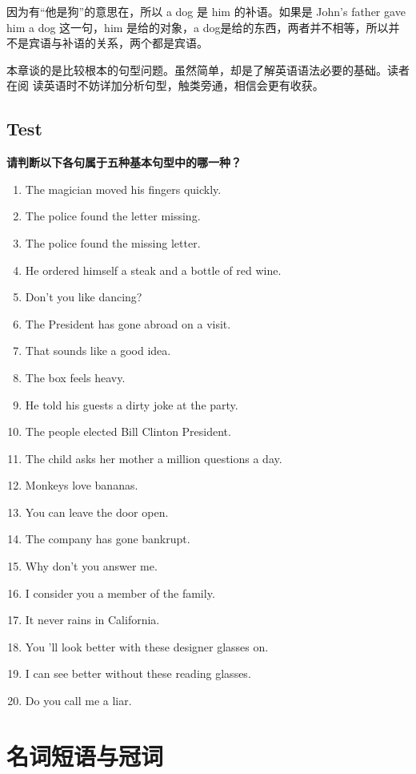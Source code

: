 \documentclass{yufa}
\begin{document}
因为有“他是狗”的意思在，所以 a dog 是 him 的补语。如果是 John's father
gave him a dog 这一句，him 是给的对象，a dog是给的东西，两者并不相等，所以并
不是宾语与补语的关系，两个都是宾语。

本章谈的是比较根本的句型问题。虽然简单，却是了解英语语法必要的基础。读者在阅
读英语时不妨详加分析句型，触类旁通，相信会更有收获。

\section{Test}

\textbf{请判断以下各句属于五种基本句型中的哪一种？}

\begin{enumerate}
\item The magician moved his fingers quickly.
\item The police found the letter missing.
\item The police found the missing letter.
\item He ordered himself a steak and a bottle of red wine.
\item Don't you like dancing?
\item The President has gone abroad on a visit.
\item That sounds like a good idea.
\item The box feels heavy.
\item He told his guests a dirty joke at the party.
\item The people elected Bill Clinton President.
\item The child asks her mother a million questions a day.
\item Monkeys love bananas.
\item You can leave the door open.
\item The company has gone bankrupt.
\item Why don't you answer me.
\item I consider you a member of the family.
\item It never rains in California.
\item You 'll look better with these designer glasses on.
\item I can see better without these reading glasses.
\item Do you call me a liar.
\end{enumerate}

\chapter{名词短语与冠词}
\end{document}
